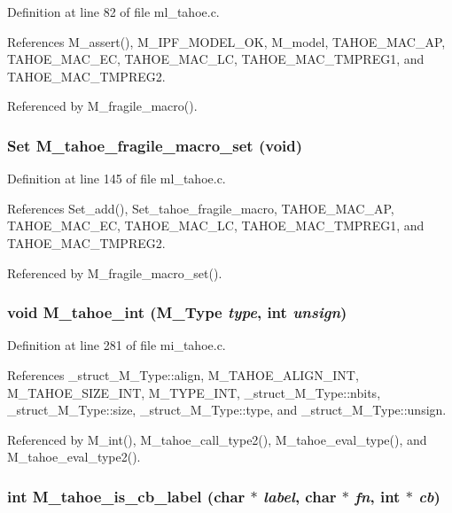Definition at line 82 of file ml\_\-tahoe.c.

References M\_\-assert(), M\_\-IPF\_\-MODEL\_\-OK, M\_\-model, TAHOE\_\-MAC\_\-AP, TAHOE\_\-MAC\_\-EC, TAHOE\_\-MAC\_\-LC, TAHOE\_\-MAC\_\-TMPREG1, and TAHOE\_\-MAC\_\-TMPREG2.

Referenced by M\_\-fragile\_\-macro().
\subsubsection{\setlength{\rightskip}{0pt plus 5cm}\bf{Set} M\_\-tahoe\_\-fragile\_\-macro\_\-set (void)}\label{m__tahoe_8h_045f863fbc9ff1d585ce675a3b783ab0}




Definition at line 145 of file ml\_\-tahoe.c.

References Set\_\-add(), Set\_\-tahoe\_\-fragile\_\-macro, TAHOE\_\-MAC\_\-AP, TAHOE\_\-MAC\_\-EC, TAHOE\_\-MAC\_\-LC, TAHOE\_\-MAC\_\-TMPREG1, and TAHOE\_\-MAC\_\-TMPREG2.

Referenced by M\_\-fragile\_\-macro\_\-set().
\subsubsection{\setlength{\rightskip}{0pt plus 5cm}void M\_\-tahoe\_\-int (\bf{M\_\-Type} {\em type}, int {\em unsign})}\label{m__tahoe_8h_7dd8e5b7aba56b59a277b8fee6d6089c}




Definition at line 281 of file mi\_\-tahoe.c.

References \_\-struct\_\-M\_\-Type::align, M\_\-TAHOE\_\-ALIGN\_\-INT, M\_\-TAHOE\_\-SIZE\_\-INT, M\_\-TYPE\_\-INT, \_\-struct\_\-M\_\-Type::nbits, \_\-struct\_\-M\_\-Type::size, \_\-struct\_\-M\_\-Type::type, and \_\-struct\_\-M\_\-Type::unsign.

Referenced by M\_\-int(), M\_\-tahoe\_\-call\_\-type2(), M\_\-tahoe\_\-eval\_\-type(), and M\_\-tahoe\_\-eval\_\-type2().
\subsubsection{\setlength{\rightskip}{0pt plus 5cm}int M\_\-tahoe\_\-is\_\-cb\_\-label (char $\ast$ {\em label}, char $\ast$ {\em fn}, int $\ast$ {\em cb})}\label{m__tahoe_8h_65db155eb6457075e24b5580b6bb6ba7}




